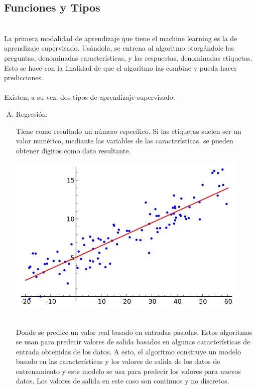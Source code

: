 \documentclass[11pt,a4paper]{article}
\begin{document}
			\subsection{Funciones y Tipos}
			\\La primera modalidad de aprendizaje que tiene el machine learning es la de aprendizaje supervisado. Usándola, se entrena al algoritmo otorgándole las preguntas, denominadas características, y las respuestas, denominadas etiquetas. Esto se hace con la finalidad de que el algoritmo las combine y pueda hacer predicciones.\\
            
            \\Existen, a su vez, dos tipos de aprendizaje supervisado:\\
		
			\begin{enumerate}[A.]
			
			\item Regresión:
			
			    Tiene como resultado un número específico. Si las etiquetas suelen ser un valor numérico, mediante las variables de las características, se pueden obtener dígitos como dato resultante.\\
			
			    \begin{center}	\includegraphics[scale=0.5]{./Imagenes/regresion}
    			\end{center}
			
			    \\Donde se predice un valor real basado en entradas pasadas. Estos algoritmos se usan para predecir valores de salida basados en algunas características de entrada obtenidas de los datos. A esto, el algoritmo construye un modelo basado en las características y los valores de salida de los datos de entrenamiento y este modelo se usa para predecir los valores para nuevos datos. Los valores de salida en este caso son continuos y no discretos.\\


\end{enumerate}
\end{document}
